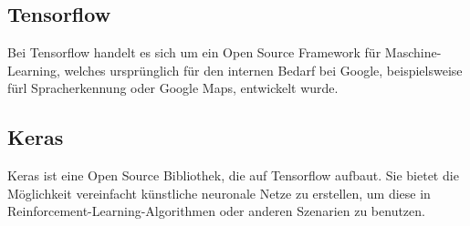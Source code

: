 \subsection{Tensorflow}
Bei Tensorflow \cite{tensorflow} handelt es sich um ein Open Source Framework für Maschine-Learning, welches ursprünglich für den internen Bedarf bei Google, beispielsweise fürl Spracherkennung oder Google Maps, entwickelt wurde. 

\subsection{Keras}
Keras\cite{keras} ist eine Open Source Bibliothek, die auf Tensorflow aufbaut. Sie bietet die Möglichkeit vereinfacht künstliche neuronale Netze zu erstellen, um diese in Reinforcement-Learning-Algorithmen oder anderen Szenarien zu benutzen.



